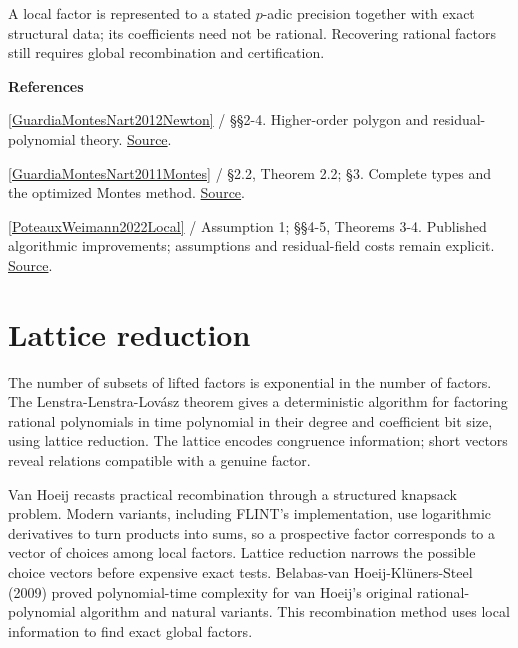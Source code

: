 \documentclass[11pt,a4paper,oneside,openany]{book}
\newenvironment{sources}{\par\smallskip\begingroup\footnotesize\color{atlasgray}\leftskip=10pt\setlength{\parskip}{2pt}}{\par\endgroup\smallskip}
\begin{document}
\color{black} A local factor is represented to a stated \(p\)-adic precision together with exact structural data; its coefficients need not be rational. Recovering rational factors still requires global recombination and certification.\par
\begin{sources}
\textbf{References}\par\smallskip
\noindent\hyperlink{ref:GuardiaMontesNart2012Newton}{[GuardiaMontesNart2012Newton]} / §§2-4. Higher-order polygon and residual-polynomial theory. \href{https://doi.org/10.1090/S0002-9947-2011-05442-5}{Source}.\par
\noindent\hyperlink{ref:GuardiaMontesNart2011Montes}{[GuardiaMontesNart2011Montes]} / §2.2, Theorem 2.2; §3. Complete types and the optimized Montes method. \href{https://www.numdam.org/articles/10.5802/jtnb.782/}{Source}.\par
\noindent\hyperlink{ref:PoteauxWeimann2022Local}{[PoteauxWeimann2022Local]} / Assumption 1; §§4-5, Theorems 3-4. Published algorithmic improvements; assumptions and residual-field costs remain explicit. \href{https://doi.org/10.1145/3476446.3535487}{Source}.\par
\end{sources}\color{black}
\section{Lattice reduction}
\color{black} The number of subsets of lifted factors is exponential in the number of factors. The Lenstra-Lenstra-Lovász theorem gives a deterministic algorithm for factoring rational polynomials in time polynomial in their degree and coefficient bit size, using lattice reduction. The lattice encodes congruence information; short vectors reveal relations compatible with a genuine factor.\par
\color{black} Van Hoeij recasts practical recombination through a structured knapsack problem. Modern variants, including FLINT's implementation, use logarithmic derivatives to turn products into sums, so a prospective factor corresponds to a vector of choices among local factors. Lattice reduction narrows the possible choice vectors before expensive exact tests. Belabas-van Hoeij-Klüners-Steel (2009) proved polynomial-time complexity for van Hoeij's original rational-polynomial algorithm and natural variants. This recombination method uses local information to find exact global factors.\par
\end{document}
